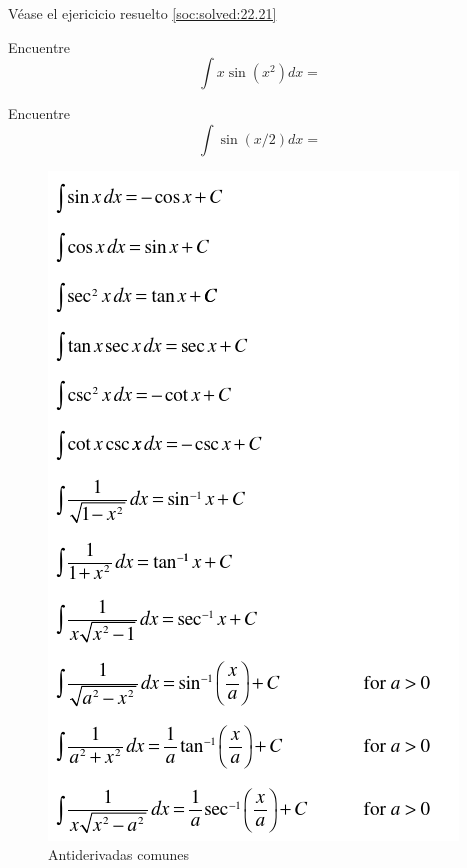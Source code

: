  Véase el ejericicio resuelto \ref{soc:solved:22.21}



 \begin{resuelto}
  \label{soc:exmp:22.7.a}
  Encuentre $$\int x \sin(x^{2})dx=$$
 \end{resuelto}




 \begin{resuelto}
  \label{soc:exmp:22.7.b}
  Encuentre $$\int  \sin(x/2)dx=$$
 \end{resuelto}




  \begin{figure}
 \centering
 \includegraphics[height=.8\textheight]{./calculo/antiderivadas.png}
 \caption{Antiderivadas comunes}
 \label{fig:antiderivadas}
\end{figure}




